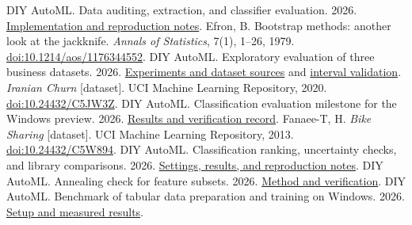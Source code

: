 \documentclass[10pt,a4paper]{article}
\newcommand{\record}[2]{\href{https://github.com/okamasaya/DIY_AutoML/blob/80b25cc/#1}{#2}}
\begin{document}
{\small\raggedright
\begin{thebibliography}{9}
\setlength{\itemsep}{2pt}
DIY AutoML. Data auditing, extraction, and classifier evaluation. 2026.
\record{docs/DATA_AUDIT.md}{Implementation and reproduction notes}.
Efron, B. Bootstrap methods: another look at the jackknife.
\emph{Annals of Statistics}, 7(1), 1--26, 1979.
\href{https://doi.org/10.1214/aos/1176344552}{doi:10.1214/aos/1176344552}.
DIY AutoML. Exploratory evaluation of three business datasets. 2026.
\record{docs/BUSINESS_QUICK_RESULTS.md}{Experiments and dataset sources} and
\record{docs/VALIDATION_METRIC_UNCERTAINTY.md}{interval validation}.
\emph{Iranian Churn} [dataset]. UCI Machine Learning Repository, 2020.
\href{https://doi.org/10.24432/C5JW3Z}{doi:10.24432/C5JW3Z}.
DIY AutoML. Classification evaluation milestone for the Windows preview. 2026.
\record{docs/BP_CLASSIFICATION_MILESTONE_20261119.md}{Results and verification record}.
Fanaee-T, H. \emph{Bike Sharing} [dataset]. UCI Machine Learning Repository, 2013.
\href{https://doi.org/10.24432/C5W894}{doi:10.24432/C5W894}.
DIY AutoML. Classification ranking, uncertainty checks, and library comparisons. 2026.
\record{docs/THREAD_SUMMARY_20261118.md}{Settings, results, and reproduction notes}.
DIY AutoML. Annealing check for feature subsets. 2026.
\record{docs/ANNEALING_CHECK.md}{Method and verification}.
DIY AutoML. Benchmark of tabular data preparation and training on Windows. 2026.
\record{experiments/tabular_scale_benchmark/README.md}{Setup and measured results}.
\end{thebibliography}
}
\end{document}
